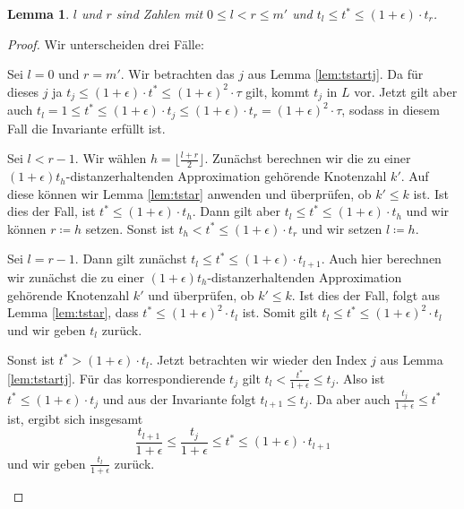 \documentclass[11pt]{article}
\newtheorem{lemma}[theorem]{Lemma}
\begin{document}
	\begin{lemma}
		\label{lem:invariantmdps}
		$l$ und $r$ sind Zahlen mit $0 \leq l < r \leq m'$ und $t_l \leq t^* \leq (1 + \epsilon)\cdot t_r$.
	\end{lemma}
	\begin{proof}
		Wir unterscheiden drei Fälle:
		\begin{description}[topsep=0mm, itemsep=0mm]
			\item[Fall 1:] Sei $l = 0$ und $r = m'$.
			Wir betrachten das $j$ aus Lemma \ref{lem:tstartj}. 
			Da für dieses $j$ ja $t_j \leq (1 + \epsilon) \cdot t^* \leq (1 + \epsilon)^2 \cdot \tau$ gilt, kommt $t_j$ in $L$ vor. 
			Jetzt gilt aber auch $t_l = 1 
			\leq t^* 
			\leq (1 + \epsilon) \cdot t_j 
			\leq (1 + \epsilon) \cdot t_r 
			= (1 + \epsilon)^2 \cdot \tau$, sodass in diesem Fall die Invariante erfüllt ist.
			
			\item[Fall 2:] Sei $l < r-1$. 
			Wir wählen $h = \lfloor \frac{l + r}{2} \rfloor$. 
			Zunächst berechnen wir die zu einer $(1 + \epsilon)t_h$-distanzerhaltenden Approximation gehörende Knotenzahl $k'$. 
			Auf diese können wir Lemma \ref{lem:tstar} anwenden und überprüfen, ob $k' \leq k$ ist.
			Ist dies der Fall, ist $t^* \leq (1 + \epsilon) \cdot t_h$. 
			Dann gilt aber $t_l \leq t^* \leq  (1 + \epsilon) \cdot t_h$ und wir können $r \coloneqq h$ setzen. 
			Sonst ist $t_h < t^* \leq (1 + \epsilon)\cdot t_r$ und wir setzen $l \coloneqq h$.
			
			\item[Fall 3:] Sei $l = r - 1$. Dann gilt zunächst $t_l \leq t^* \leq (1 + \epsilon)\cdot t_{l+1}$. 
			Auch hier berechnen wir zunächst die zu einer $(1 + \epsilon)t_h$-distanzerhaltenden Approximation gehörende Knotenzahl $k'$ und überprüfen, ob $k' \leq k$.
			Ist dies der Fall, folgt aus Lemma \ref{lem:tstar}, dass $t^* \leq (1 + \epsilon)^2 \cdot t_l$ ist. 
			Somit gilt $t_l \leq t^* \leq (1 + \epsilon)^2 \cdot t_l$ und wir geben $t_l$ zurück.
			
			Sonst ist $t^* > (1 + \epsilon)\cdot t_l$. 
			Jetzt betrachten wir wieder den Index $j$ aus Lemma \ref{lem:tstartj}. 
			Für das korrespondierende $t_j$ gilt $t_l < \frac{t^*}{1 + \epsilon} \leq t_j$. Also ist $t^* \leq (1 + \epsilon) \cdot t_j$ und aus der Invariante folgt $t_{l+1} \leq t_j$.
			Da aber auch $\frac{t_j}{1 + \epsilon} \leq t^*$ ist, ergibt sich insgesamt 
			\[
			\frac{t_{l+1}}{1 + \epsilon} 
			\leq \frac{t_j}{1 + \epsilon} 
			\leq t^* 
			\leq (1 + \epsilon) \cdot t_{l+1}
			\]
			und wir geben $\frac{t_l}{1 + \epsilon}$ zurück.
		\end{description}
	\end{proof}
	
\end{document}
